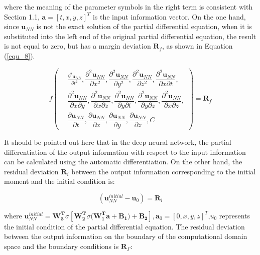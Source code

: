 \documentclass[10pt,journal,compsoc]{IEEEtran}
\begin{document}
where the meaning of the parameter symbols in the right term is consistent with Section 1.1, $\mathbf{a} = [t,x,y,z ]^{T}$ is the input information vector. On the one hand, since $\mathbf{u}_{NN}$ is not the exact solution of the partial differential equation, when it is substituted into the left end of the original partial differential equation, the result is not equal to zero, but has a margin deviation $\mathbf{R}_{f}$, as shown in Equation (\ref{equ_8}).



\begin{equation}
f \left (
\begin{aligned}
&\frac{\partial^{2} \mathbf{u}_{NN}}{\partial{t^2}},
\dfrac{\partial^{2} \mathbf{u}_{NN}}{\partial{x^2}},
\dfrac{\partial^{2} \mathbf{u}_{NN}}{\partial{y^2}},
\dfrac{\partial^{2} \mathbf{u}_{NN}}{\partial{z^2}},
\dfrac{\partial^{2} \mathbf{u}_{NN}}{\partial{x}\partial{t}},\\
&\dfrac{\partial^{2} \mathbf{u}_{NN}}{\partial{x}\partial{y}},
\dfrac{\partial^{2} \mathbf{u}_{NN}}{\partial{x}\partial{z}},
\dfrac{\partial^{2} \mathbf{u}_{NN}}{\partial{y}\partial{t}},
\dfrac{\partial^{2} \mathbf{u}_{NN}}{\partial{y}\partial{z}},
\dfrac{\partial^{2} \mathbf{u}_{NN}}{\partial{x}\partial{z}},\\
&\dfrac{\partial \mathbf{u}_{NN}}{\partial{t}},
\dfrac{\partial \mathbf{u}_{NN}}{\partial{x}},
\dfrac{\partial \mathbf{u}_{NN}}{\partial{y}},
\dfrac{\partial \mathbf{u}_{NN}}{\partial{z}},
C
\end{aligned}
\right ) = \mathbf{R}_{f}
\label{equ_8}
\end{equation}

It should be pointed out here that in the deep neural network, the partial differentiation of the output information with respect to the input information can be calculated using the automatic differentiation. On the other hand, the residual deviation $\mathbf{R}_{i}$ between the output information corresponding to the initial moment and the initial condition is:


\begin{equation}
(\mathbf{u}_{NN}^{initial} - \mathbf{u}_{0}) = \mathbf{R}_{i}
\label{equ_9}
\end{equation}

where $\mathbf{u}_{NN}^{initial}=\mathbf{W_{3}^{T}} \sigma{[\mathbf{W_{2}^{T}} \sigma{(\mathbf{W_{1}^{T}a + \mathbf{B_{1}})}} + \mathbf{B_2}]},\mathbf{a}_{0}=[0,x,y,z]^{T}$,$u_{0}$ represents the initial condition of the partial differential equation. The residual deviation between the output information on the boundary of the computational domain space and the boundary conditions is $\mathbf{R}_{\Gamma}$:
\end{document}

